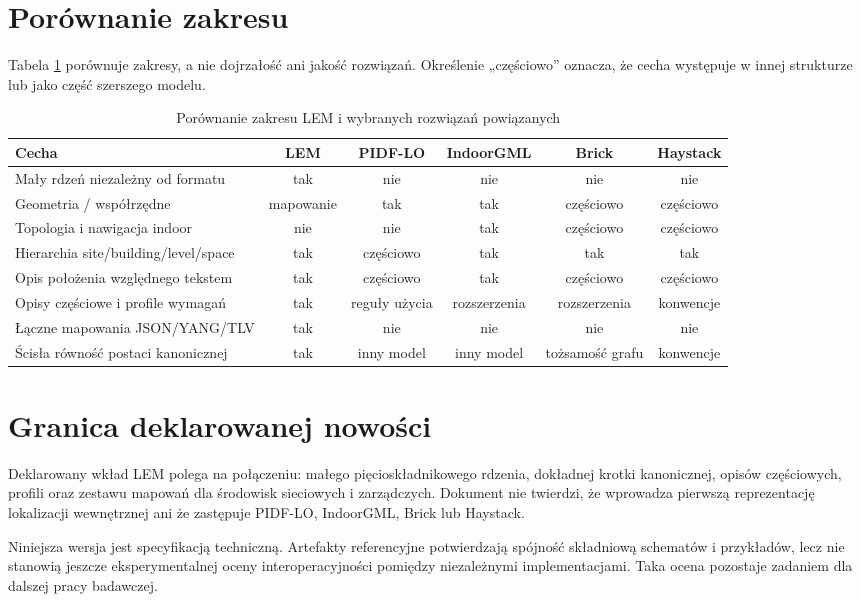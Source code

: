 \section{Porównanie zakresu}
Tabela \ref{tab:related-comparison} porównuje zakresy, a nie dojrzałość ani jakość rozwiązań. Określenie „częściowo” oznacza, że cecha występuje w innej strukturze lub jako część szerszego modelu.

\begin{table}[htbp]
\centering
\footnotesize
\setlength{\tabcolsep}{3pt}
\begin{tabularx}{\textwidth}{|>{\raggedright\arraybackslash}X|c|c|c|c|c|}
\hline
\textbf{Cecha} & \textbf{LEM} & \textbf{PIDF-LO} & \textbf{IndoorGML} & \textbf{Brick} & \textbf{Haystack} \\ \hline
Mały rdzeń niezależny od formatu & tak & nie & nie & nie & nie \\ \hline
Geometria / współrzędne & mapowanie & tak & tak & częściowo & częściowo \\ \hline
Topologia i nawigacja indoor & nie & nie & tak & częściowo & częściowo \\ \hline
Hierarchia site/building/level/space & tak & częściowo & tak & tak & tak \\ \hline
Opis położenia względnego tekstem & tak & częściowo & tak & częściowo & częściowo \\ \hline
Opisy częściowe i profile wymagań & tak & reguły użycia & rozszerzenia & rozszerzenia & konwencje \\ \hline
Łączne mapowania JSON/YANG/TLV & tak & nie & nie & nie & nie \\ \hline
Ścisła równość postaci kanonicznej & tak & inny model & inny model & tożsamość grafu & konwencje \\ \hline
\end{tabularx}
\caption{Porównanie zakresu LEM i wybranych rozwiązań powiązanych}
\label{tab:related-comparison}
\end{table}

\section{Granica deklarowanej nowości}
Deklarowany wkład LEM polega na połączeniu: małego pięcioskładnikowego rdzenia, dokładnej krotki kanonicznej, opisów częściowych, profili oraz zestawu mapowań dla środowisk sieciowych i zarządczych. Dokument nie twierdzi, że wprowadza pierwszą reprezentację lokalizacji wewnętrznej ani że zastępuje PIDF-LO, IndoorGML, Brick lub Haystack.

Niniejsza wersja jest specyfikacją techniczną. Artefakty referencyjne potwierdzają spójność składniową schematów i przykładów, lecz nie stanowią jeszcze eksperymentalnej oceny interoperacyjności pomiędzy niezależnymi implementacjami. Taka ocena pozostaje zadaniem dla dalszej pracy badawczej.

